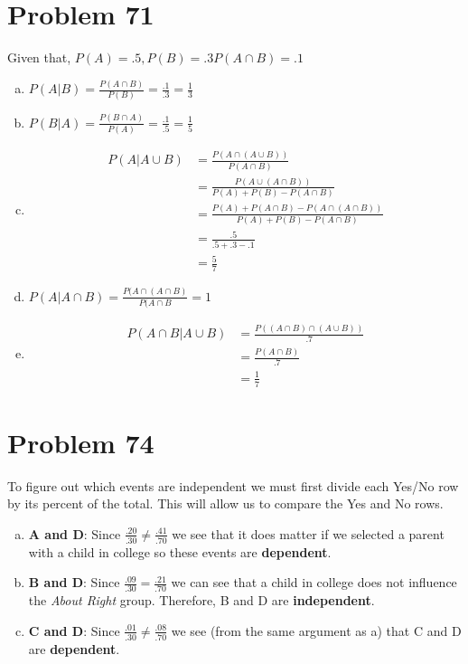 \documentclass{article}
\begin{document}
\section*{Problem 71}
Given that, $P(A) = .5, P(B) = .3 P(A \cap B) = .1$
\begin{enumerate}[a)]
\item $P(A|B) = \frac{P(A \cap B)}{P(B)} = \frac{.1}{.3} = \frac{1}{3}$
\item $P(B|A) = \frac{P(B \cap A)}{P(A)} = \frac{.1}{.5} = \frac{1}{5}$
\item \begin{align*}
    P(A|A \cup B) &= \frac{P(A \cap (A \cup B))}{P(A \cap B)}\\[.2cm]
    &= \frac{P(A \cup (A \cap B))}{P(A) + P(B) - P(A \cap B)}\\[.2cm]
    &= \frac{P(A) + P(A \cap B) - P(A \cap (A \cap B))}{P(A) + P(B) - P(A \cap B)}\\[.2cm]
    &= \frac{.5}{.5 + .3 - .1}\\[.2cm]
    &= \frac{5}{7}
  \end{align*}
\item $P(A|A \cap B) = \frac{P(A \cap (A \cap B)}{P(A \cap B} = 1$
\item \begin{align*}
    P(A \cap B | A \cup B) &= \frac{P((A \cap B) \cap (A \cup B))}{.7}\\[.2cm]
    &= \frac{P(A \cap B)}{.7}\\
    &= \frac{1}{7}
  \end{align*}
\end{enumerate}

\section*{Problem 74}
To figure out which events are independent we must first divide each Yes/No row by its percent of the total. This will allow us to compare the Yes and No rows.
\begin{enumerate}[a)]
\item \textbf{A and D}: Since $\frac{.20}{.30} \not = \frac{.41}{.70}$ we see that it does matter if we selected a parent with a child in college so these events are \textbf{dependent}.

\item \textbf{B and D}: Since $\frac{.09}{.30} = \frac{.21}{.70}$ we can see that a child in college does not influence the \textit{About Right} group. Therefore, B and D are \textbf{independent}.

\item \textbf{C and D}: Since $\frac{.01}{.30} \not = \frac{.08}{.70}$ we see (from the same argument as a) that C and D are \textbf{dependent}.

\end{enumerate}
\end{document}

